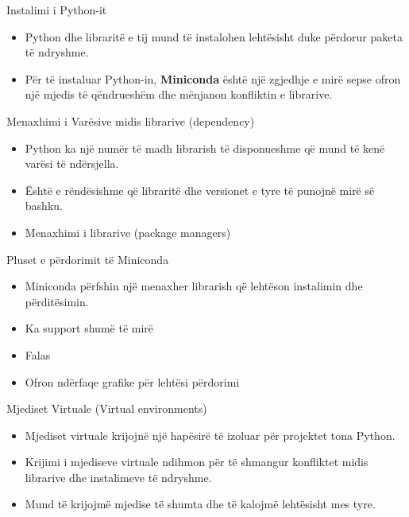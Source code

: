 \documentclass[
  ignorenonframetext,
]{beamer}
\begin{document}
\begin{frame}{Instalimi i Python-it}
\protect\hypertarget{instalimi-i-python-it}{}
\begin{itemize}
\item
  Python dhe libraritë e tij mund të instalohen lehtësisht duke përdorur
  paketa të ndryshme.
\item
  Për të instaluar Python-in, \textbf{Miniconda} është një zgjedhje e
  mirë sepse ofron një mjedis të qëndrueshëm dhe mënjanon konfliktin e
  librarive.
\end{itemize}
\end{frame}

\begin{frame}{Menaxhimi i Varësive midis librarive (dependency)}
\protect\hypertarget{menaxhimi-i-varuxebsive-midis-librarive-dependency}{}
\begin{itemize}
\item
  Python ka një numër të madh librarish të disponueshme që mund të kenë
  varësi të ndërsjella.
\item
  Është e rëndësishme që libraritë dhe versionet e tyre të punojnë mirë
  së bashku.
\item
  Menaxhimi i librarive (package managers)
\end{itemize}
\end{frame}

\begin{frame}{Pluset e përdorimit të Miniconda}
\protect\hypertarget{pluset-e-puxebrdorimit-tuxeb-miniconda}{}
\begin{itemize}
\item
  Miniconda përfshin një menaxher librarish që lehtëson instalimin dhe
  përditësimin.
\item
  Ka support shumë të mirë
\item
  Falas
\item
  Ofron ndërfaqe grafike për lehtësi përdorimi
\end{itemize}
\end{frame}

\begin{frame}{Mjediset Virtuale (Virtual environments)}
\protect\hypertarget{mjediset-virtuale-virtual-environments}{}
\begin{itemize}
\item
  Mjediset virtuale krijojnë një hapësirë të izoluar për projektet tona
  Python.
\item
  Krijimi i mjediseve virtuale ndihmon për të shmangur konfliktet midis
  librarive dhe instalimeve të ndryshme.
\item
  Mund të krijojmë mjedise të shumta dhe të kalojmë lehtësisht mes tyre.
\end{itemize}
\end{frame}
\end{document}
